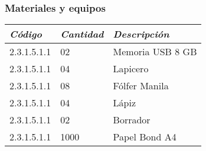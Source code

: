     \subsubsection{Materiales y equipos}
            \begin{table}[h!]
                \centering
                \begin{tabular}{|p{3cm}|p{2cm}|p{5cm}|} \hline
                    
                
                \textit{{\bf{Código}}} &
                \textit{{\bf{Cantidad}}} &
                \textit{{\bf{Descripción}}}
                \\ \hline

                2.3.1.5.1.1 &
                02 &
                Memoria USB 8 GB
                \\ \hline

                2.3.1.5.1.1 &
                04 &
                Lapicero
                \\ \hline

                2.3.1.5.1.1 &
                08 &
                Fólfer Manila
                \\ \hline

                2.3.1.5.1.1 &
                04 &
                Lápiz
                \\ \hline

                2.3.1.5.1.1 &
                02 &
                Borrador
                \\ \hline

                2.3.1.5.1.1 &
                1000 &
                Papel Bond A4
                \\ \hline

                \end{tabular}
            \end{table}
